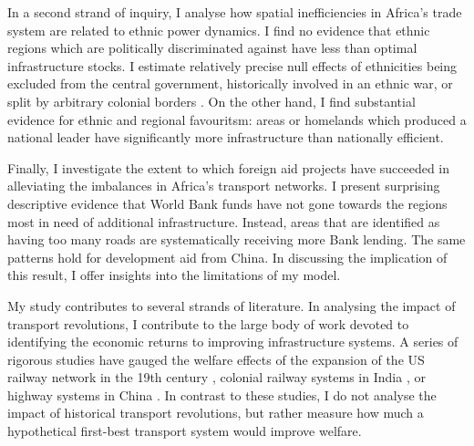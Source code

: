 \documentclass[11pt, oneside]{article}   	%
\begin{document}
In a second strand of inquiry, I analyse how spatial inefficiencies in Africa's trade system are related to ethnic power dynamics. I find no evidence that ethnic regions which are politically discriminated against have less than optimal infrastructure stocks. I estimate relatively precise null effects of ethnicities being excluded from the central government, historically involved in an ethnic war, or split by arbitrary colonial borders \citep{michalopoulos_long-run_2016}. On the other hand, I find substantial evidence for ethnic and regional favouritsm: areas or homelands which produced a national leader have significantly more infrastructure than nationally efficient.

Finally, I investigate the extent to which foreign aid projects have succeeded in alleviating the imbalances in Africa's transport networks. I present surprising descriptive evidence that World Bank funds have not gone towards the regions most in need of additional infrastructure. Instead, areas that are identified as having too many roads are systematically receiving more Bank lending. The same patterns hold for development aid from China. In discussing the implication of this result, I offer insights into the limitations of my model.

My study contributes to several strands of literature. In analysing the impact of transport revolutions, I contribute to the large body of work devoted to identifying the economic returns to improving infrastructure systems. A series of rigorous studies have gauged the welfare effects of the expansion of the US railway network in the 19th century \citep{donaldson_railroads_2016,swisher_reassessing_2017}, colonial railway systems in India \citep{Donaldson_RailroadsRajEstimating_2018,burgess_railroads_2012}, or highway systems in China \citep{faber_trade_2014,baum-snow_roads_2017}. In contrast to these studies, I do not analyse the impact of historical transport revolutions, but rather measure how much a hypothetical first-best transport system would improve welfare.
\end{document}
